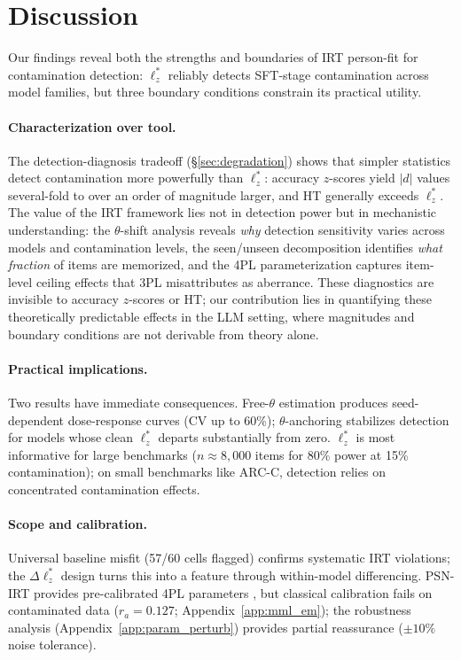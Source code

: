 \section{Discussion}\label{sec:discussion}

Our findings reveal both the strengths and boundaries of IRT person-fit for contamination detection: $\ell_z^*$ reliably detects SFT-stage contamination across model families, but three boundary conditions constrain its practical utility.

\paragraph{Characterization over tool.}
The detection-diagnosis tradeoff (\S\ref{sec:degradation}) shows that simpler statistics detect contamination more powerfully than $\ell_z^*$: accuracy $z$-scores yield $|d|$ values several-fold to over an order of magnitude larger, and HT generally exceeds $\ell_z^*$.
The value of the IRT framework lies not in detection power but in mechanistic understanding: the $\theta$-shift analysis reveals \emph{why} detection sensitivity varies across models and contamination levels, the seen/unseen decomposition identifies \emph{what fraction} of items are memorized, and the 4PL parameterization captures item-level ceiling effects that 3PL misattributes as aberrance.
These diagnostics are invisible to accuracy $z$-scores or HT; our contribution lies in quantifying these theoretically predictable effects in the LLM setting, where magnitudes and boundary conditions are not derivable from theory alone.

\paragraph{Practical implications.}
Two results have immediate consequences.
Free-$\theta$ estimation produces seed-dependent dose-response curves (CV up to 60\%); $\theta$-anchoring stabilizes detection for models whose clean $\ell_z^*$ departs substantially from zero.
$\ell_z^*$ is most informative for large benchmarks ($n \approx 8{,}000$ items for 80\% power at 15\% contamination); on small benchmarks like ARC-C, detection relies on concentrated contamination effects.

\paragraph{Scope and calibration.}
Universal baseline misfit (57/60 cells flagged) confirms systematic IRT violations; the $\Delta\ell_z^*$ design turns this into a feature through within-model differencing.
PSN-IRT provides pre-calibrated 4PL parameters \citep{psnirt2026}, but classical calibration fails on contaminated data ($r_a{=}0.127$; Appendix~\ref{app:mml_em}); the robustness analysis (Appendix~\ref{app:param_perturb}) provides partial reassurance (${\pm}10\%$ noise tolerance).
